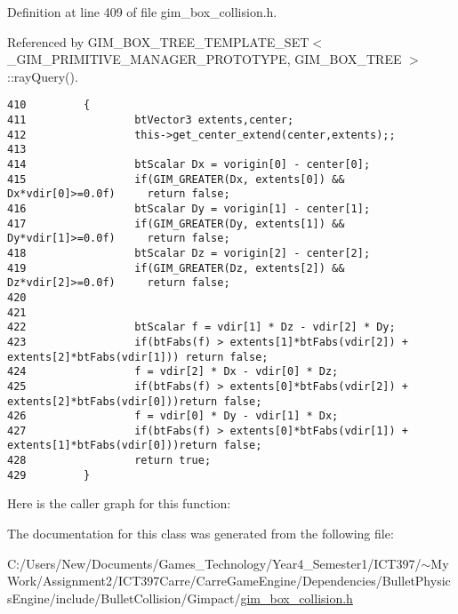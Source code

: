 Definition at line 409 of file gim\_\-box\_\-collision.h.

Referenced by GIM\_\-BOX\_\-TREE\_\-TEMPLATE\_\-SET$<$ \_\-GIM\_\-PRIMITIVE\_\-MANAGER\_\-PROTOTYPE, GIM\_\-BOX\_\-TREE $>$::rayQuery().

\begin{Code}\begin{verbatim}410         {
411                 btVector3 extents,center;
412                 this->get_center_extend(center,extents);;
413 
414                 btScalar Dx = vorigin[0] - center[0];
415                 if(GIM_GREATER(Dx, extents[0]) && Dx*vdir[0]>=0.0f)     return false;
416                 btScalar Dy = vorigin[1] - center[1];
417                 if(GIM_GREATER(Dy, extents[1]) && Dy*vdir[1]>=0.0f)     return false;
418                 btScalar Dz = vorigin[2] - center[2];
419                 if(GIM_GREATER(Dz, extents[2]) && Dz*vdir[2]>=0.0f)     return false;
420 
421 
422                 btScalar f = vdir[1] * Dz - vdir[2] * Dy;
423                 if(btFabs(f) > extents[1]*btFabs(vdir[2]) + extents[2]*btFabs(vdir[1])) return false;
424                 f = vdir[2] * Dx - vdir[0] * Dz;
425                 if(btFabs(f) > extents[0]*btFabs(vdir[2]) + extents[2]*btFabs(vdir[0]))return false;
426                 f = vdir[0] * Dy - vdir[1] * Dx;
427                 if(btFabs(f) > extents[0]*btFabs(vdir[1]) + extents[1]*btFabs(vdir[0]))return false;
428                 return true;
429         }
\end{verbatim}
\end{Code}




Here is the caller graph for this function:

The documentation for this class was generated from the following file:\begin{CompactItemize}
\item 
C:/Users/New/Documents/Games\_\-Technology/Year4\_\-Semester1/ICT397/$\sim$My Work/Assignment2/ICT397Carre/CarreGameEngine/Dependencies/BulletPhysicsEngine/include/BulletCollision/Gimpact/\hyperlink{gim__box__collision_8h}{gim\_\-box\_\-collision.h}\end{CompactItemize}
